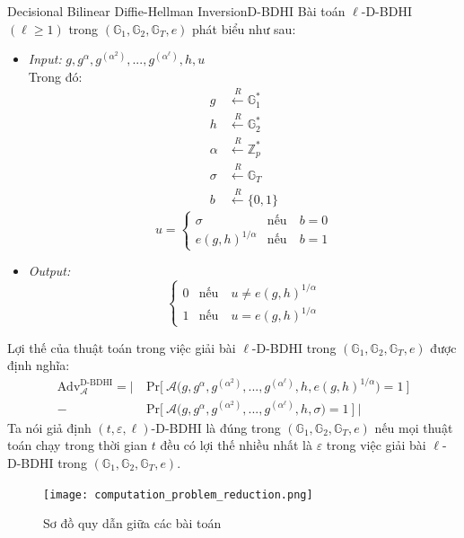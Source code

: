 \documentclass[class=report, crop=false]{standalone}
\begin{document}
		\begin{problem}{Decisional Bilinear Diffie-Hellman Inversion}{D-BDHI}
			Bài toán $\ell$-D-BDHI $(\ell \geq 1)$ trong $(\mathbb{G}_1, \mathbb{G}_2, \mathbb{G}_T, e)$ phát biểu như sau:
			\vspace{-\baselineskip}
			\begin{itemize}[leftmargin=1.5cm, itemindent=-0.5cm]
				\item[] \textit{Input:} $g, g^\alpha, g^{(\alpha^2)}, ..., g^{(\alpha^\ell)}, h, u$ \\
				Trong đó: \vspace{-\baselineskip}
				\begin{align*}
					g 		&\xleftarrow{R} \mathbb{G}_1^* \\
					h 		&\xleftarrow{R} \mathbb{G}_2^* \\
					\alpha 	&\xleftarrow{R} \mathbb{Z}_p^* \\
					\sigma 	&\xleftarrow{R} \mathbb{G}_T \\
					b 		&\xleftarrow{R} \{ 0, 1 \}
				\end{align*}
				\[
					u = \begin{cases}
						\sigma 							&\text{nếu}\quad b = 0 \\
						e(g, h)^{1/\alpha} 	&\text{nếu}\quad b = 1
					\end{cases}
				\]
				\item[] \textit{Output:}
				\[
					\begin{cases}
						0 &\text{nếu}\quad u \neq e(g, h)^{1/\alpha} \\
						1 &\text{nếu}\quad u = e(g, h)^{1/\alpha}
					\end{cases}
				\] 
			\end{itemize}
			\vspace{-\baselineskip}\par
			Lợi thế của thuật toán \algo trong việc giải bài $\ell$-D-BDHI trong $(\mathbb{G}_1, \mathbb{G}_2, \mathbb{G}_T, e)$ được định nghĩa:
			\begin{equation*}
				\begin{split}
					\text{Adv}_{\mathcal{A}}^{\text{D-BDHI}} = \Bigg|\ &\text{Pr}\bigg[ \ \mathcal{A}\Big(g, g^\alpha, g^{(\alpha^2)}, ..., g^{(\alpha^\ell)}, h, e(g, h)^{1/\alpha} \Big) = 1 \ \bigg] \\
					- &\text{Pr}\bigg[ \ \mathcal{A}\Big(g, g^\alpha, g^{(\alpha^2)}, ..., g^{(\alpha^\ell)}, h, \sigma \Big) = 1 \ \bigg]\ \Bigg|
				\end{split}
			\end{equation*} \indent
			Ta nói giả định $(t, \varepsilon, \ell)$-D-BDHI là đúng trong $(\mathbb{G}_1, \mathbb{G}_2, \mathbb{G}_T, e)$ nếu mọi thuật toán chạy trong thời gian $t$ đều có lợi thế nhiều nhất là $\varepsilon$ trong việc giải bài $\ell$-D-BDHI trong $(\mathbb{G}_1, \mathbb{G}_2, \mathbb{G}_T, e)$.
		\end{problem}
		\begin{figure}[h]
			\captionsetup{font=normalsize}
			\texttt{[image: computation\_problem\_reduction.png]}
			\centering
			\caption{Sơ đồ quy dẫn giữa các bài toán}
		\end{figure}
\end{document}
